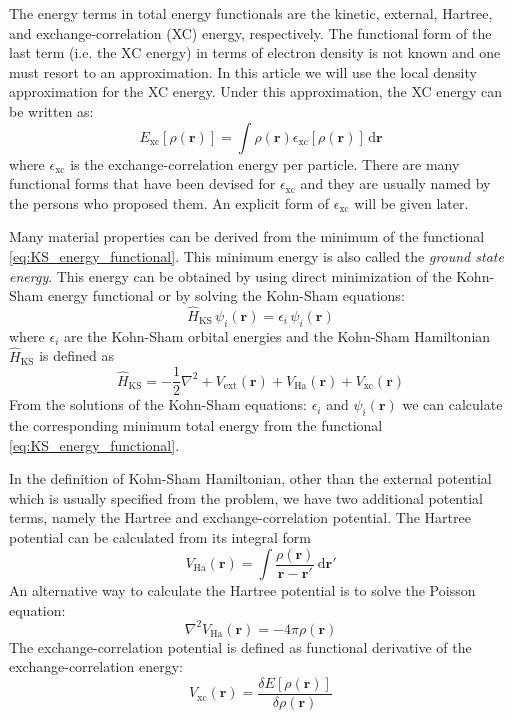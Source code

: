The energy terms in total energy functionals are the kinetic, external, Hartree, and exchange-correlation
(XC) energy, respectively. The functional form of the last term (i.e. the XC energy)
in terms of electron density is not known and one must resort to an approximation. In this article
we will use the local density approximation for the XC energy. Under this approximation, the XC energy
can be written as:
\begin{equation}
E_{\mathrm{xc}}\left[\rho(\mathbf{r})\right] =
\int \rho(\mathbf{r}) \epsilon_{\mathrm{xc}}\left[\rho(\mathbf{r})\right]\,\mathrm{d}\mathbf{r}
\end{equation}
where $\epsilon_{\mathrm{xc}}$ is the exchange-correlation energy per particle.
There are many functional forms that have been devised for $\epsilon_{\mathrm{xc}}$
and they are usually named by the persons who proposed them.
An explicit form of $\epsilon_{\mathrm{xc}}$ will be given later.


Many material properties can be derived from the minimum of the
functional \eqref{eq:KS_energy_functional}. This minimum energy is also called the
\textit{ground state energy}. This energy can be obtained by using direct
minimization of the Kohn-Sham energy functional or by solving the Kohn-Sham equations:
\begin{equation}
\hat{H}_{\mathrm{KS}}\,\psi_{i}(\mathbf{r}) = \epsilon_{i}\,\psi_{i}(\mathbf{r})
\label{eq:KS_equations}
\end{equation}
%
where $\epsilon_{i}$ are the Kohn-Sham orbital energies and the
Kohn-Sham Hamiltonian $\hat{H}_{\mathrm{KS}}$ is defined as
%
\begin{equation}
\hat{H}_{\mathrm{KS}} = -\frac{1}{2}\nabla^{2} + V_{\mathrm{ext}}(\mathbf{r}) +
V_{\mathrm{Ha}}(\mathbf{r}) + V_{\mathrm{xc}}(\mathbf{r})
\label{eq:KS_hamiltonian}
\end{equation}
%
From the solutions of the Kohn-Sham equations: ${\epsilon_{i}}$ and ${\psi_{i}(\mathbf{r})}$
we can calculate the corresponding minimum total energy from the functional
\eqref{eq:KS_energy_functional}.

In the definition of Kohn-Sham Hamiltonian, other than the external potential
which is usually specified from the problem,
we have two additional potential terms, namely the Hartree and exchange-correlation
potential.
The Hartree potential can be calculated from its integral form
\begin{equation}
V_{\mathrm{Ha}}(\mathbf{r}) = \int
\frac{\rho(\mathbf{r})}{\mathbf{r} - \mathbf{r}'}\,\mathrm{d}\mathbf{r}'
\end{equation}
An alternative way to calculate the Hartree potential is to solve the Poisson equation:
\begin{equation}
\nabla^2 V_{\mathrm{Ha}}(\mathbf{r}) = -4\pi\rho(\mathbf{r})
\label{eq:poisson_eq}
\end{equation}
%
The exchange-correlation potential is defined as functional derivative of the
exchange-correlation energy:
\begin{equation}
V_{\mathrm{xc}}(\mathbf{r}) = \frac{\delta E[\rho(\mathbf{r})]}{\delta \rho(\mathbf{r})}
\end{equation}

